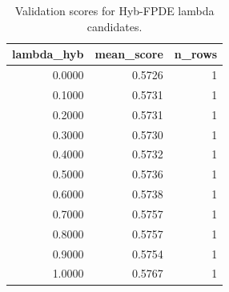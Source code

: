 \begin{table}[t]
\caption{Validation scores for Hyb-FPDE lambda candidates.}
\label{tab:lambda_distribution_computed}
\centering
\begin{tabular}{rrr}
\toprule
lambda\_hyb & mean\_score & n\_rows \\
\midrule
0.0000 & 0.5726 & 1 \\
0.1000 & 0.5731 & 1 \\
0.2000 & 0.5731 & 1 \\
0.3000 & 0.5730 & 1 \\
0.4000 & 0.5732 & 1 \\
0.5000 & 0.5736 & 1 \\
0.6000 & 0.5738 & 1 \\
0.7000 & 0.5757 & 1 \\
0.8000 & 0.5757 & 1 \\
0.9000 & 0.5754 & 1 \\
1.0000 & 0.5767 & 1 \\
\bottomrule
\end{tabular}

\end{table}
